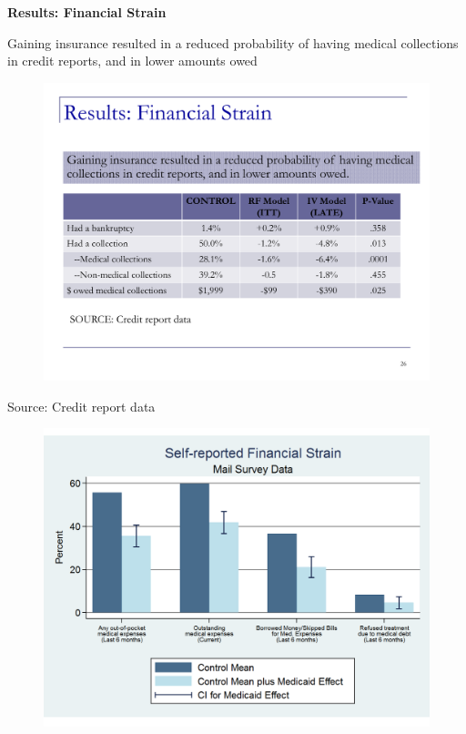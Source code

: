 \documentclass[notes=show]{beamer}
\begin{document}
\begin{frame}[plain]
	\begin{center}
	\textbf{Results: Financial Strain}
	\end{center}

Gaining insurance resulted in a reduced probability of having medical collections in credit reports, and in lower amounts owed
		
	\begin{figure}
	\includegraphics[scale=0.40]{./lecture_includes/baicker_8.pdf}
	\end{figure}
	
	Source: Credit report data
	
\end{frame}


\begin{frame}[plain]
	
	\begin{figure}
	\includegraphics[scale=0.40]{./lecture_includes/baicker_9.pdf}
	\end{figure}
\end{frame}
\end{document}
